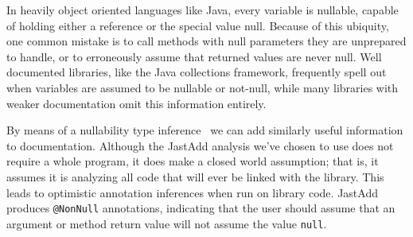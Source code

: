 In heavily object oriented languages like Java, every variable is nullable,
capable of holding either a reference or the
special value null.  Because of this ubiquity, one common mistake is to call
methods with null parameters they are unprepared to handle, or to erroneously
assume that returned values are never null.  Well documented libraries, like
the Java collections framework, frequently spell out when variables are
assumed to be nullable or not-null, while many libraries with weaker
documentation omit this information entirely.

By means of a nullability type inference~\cite{NonNullTypeInference} we can add
similarly useful information to documentation.  Although the JastAdd analysis
we've chosen to use does not require a whole program, it does make a closed
world assumption; that is, it assumes it is analyzing all code that will ever be
linked with the library.  This leads to optimistic annotation inferences when run on
library code.  JastAdd produces \texttt{@NonNull} annotations, indicating that the user should assume that an
argument or method return value will not assume the value \texttt{null}.
